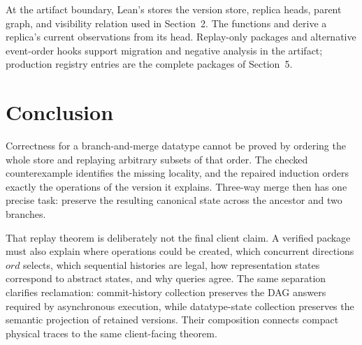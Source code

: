 At the artifact boundary, Lean's  stores the version
store, replica heads, parent graph, and visibility relation used in
Section~2. The functions  and
 derive a replica's current observations from
its head. Replay-only packages and
alternative event-order hooks support migration and negative analysis in the
artifact; production registry entries are the complete packages of Section~5.

\section{Conclusion}

Correctness for a branch-and-merge datatype cannot be proved by ordering the
whole store and replaying arbitrary subsets of that order. The checked
counterexample identifies the missing locality, and the repaired induction
orders exactly the operations of the version it explains. Three-way merge then
has one precise task: preserve the resulting canonical state across the
ancestor and two branches.

That replay theorem is deliberately not the final client claim. A verified
package must also explain where operations could be created, which concurrent
directions $ord$ selects, which sequential histories are legal, how representation
states correspond to abstract states, and why queries agree. The same
separation clarifies reclamation: commit-history collection preserves the DAG
answers required by asynchronous execution, while datatype-state collection
preserves the semantic projection of retained versions. Their composition
connects compact physical traces to the same client-facing theorem.

